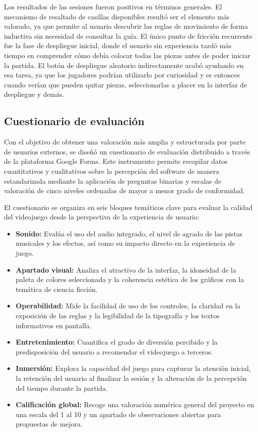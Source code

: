 Los resultados de las sesiones fueron positivos en términos generales. El mecanismo de resaltado de casillas disponibles resultó ser el elemento más valorado, ya que permite al usuario descubrir las reglas de movimiento de forma inductiva sin necesidad de consultar la guía. El único punto de fricción recurrente fue la fase de despliegue inicial, donde el usuario sin experiencia tardó más tiempo en comprender cómo debía colocar todas las piezas antes de poder iniciar la partida. El botón de despliegue aleatorio indirectamente acabó ayudando en esa tarea, ya que los jugadores podrían utilizarlo por curiosidad y es entonces cuando verían que pueden quitar piezas, seleccionarlas a placer en la interfaz de despliegue y demás.

\subsection{Cuestionario de evaluación}

Con el objetivo de obtener una valoración más amplia y estructurada por parte de usuarios externos, se diseñó un cuestionario de evaluación distribuido a través de la plataforma Google Forms. Este instrumento permite recopilar datos cuantitativos y cualitativos sobre la percepción del software de manera estandarizada mediante la aplicación de preguntas binarias y escalas de valoración de cinco niveles ordenadas de mayor a menor grado de conformidad.

El cuestionario se organiza en seis bloques temáticos clave para evaluar la calidad del videojuego desde la perspectiva de la experiencia de usuario:
\begin{itemize}
	\item \textbf{Sonido:} Evalúa el uso del audio integrado, el nivel de agrado de las pistas musicales y los efectos, así como su impacto directo en la experiencia de juego.
	\item \textbf{Apartado visual:} Analiza el atractivo de la interfaz, la idoneidad de la paleta de colores seleccionada y la coherencia estética de los gráficos con la temática de ciencia ficción.
	\item \textbf{Operabilidad:} Mide la facilidad de uso de los controles, la claridad en la exposición de las reglas y la legibilidad de la tipografía y los textos informativos en pantalla.
	\item \textbf{Entretenimiento:} Cuantifica el grado de diversión percibido y la predisposición del usuario a recomendar el videojuego a terceros.
	\item \textbf{Inmersión:} Explora la capacidad del juego para capturar la atención inicial, la retención del usuario al finalizar la sesión y la alteración de la percepción del tiempo durante la partida.
	\item \textbf{Calificación global:} Recoge una valoración numérica general del proyecto en una escala del 1 al 10 y un apartado de observaciones abiertas para propuestas de mejora.
\end{itemize}

